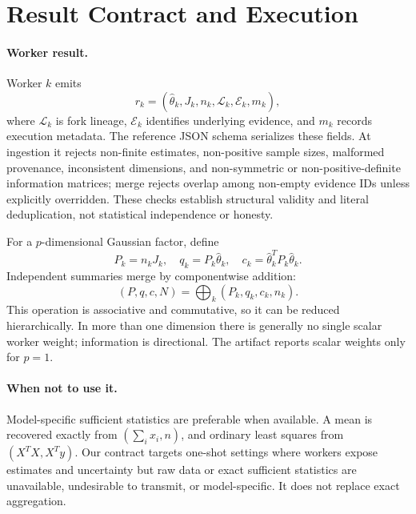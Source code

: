 \section{Result Contract and Execution}
\label{sec:model}

\paragraph{Worker result.} Worker $k$ emits
\begin{equation}
r_k=(\hat\theta_k,J_k,n_k,\mathcal L_k,\mathcal E_k,m_k),
\label{eq:contract}
\end{equation}
where $\mathcal L_k$ is fork lineage, $\mathcal E_k$ identifies underlying evidence, and $m_k$ records execution metadata. The reference JSON schema serializes these fields. At ingestion it rejects non-finite estimates, non-positive sample sizes, malformed provenance, inconsistent dimensions, and non-symmetric or non-positive-definite information matrices; merge rejects overlap among non-empty evidence IDs unless explicitly overridden. These checks establish structural validity and literal deduplication, not statistical independence or honesty.

For a $p$-dimensional Gaussian factor, define
\begin{equation}
P_k=n_kJ_k,\quad q_k=P_k\hat\theta_k,\quad
c_k=\hat\theta_k^TP_k\hat\theta_k.
\label{eq:canonical}
\end{equation}
Independent summaries merge by componentwise addition:
\begin{equation}
(P,q,c,N)=\bigoplus_k(P_k,q_k,c_k,n_k).
\label{eq:merge}
\end{equation}
This operation is associative and commutative, so it can be reduced hierarchically. In more than one dimension there is generally no single scalar worker weight; information is directional. The artifact reports scalar weights only for $p=1$.

\paragraph{When not to use it.} Model-specific sufficient statistics are preferable when available. A mean is recovered exactly from $(\sum_i x_i,n)$, and ordinary least squares from $(X^TX,X^Ty)$. Our contract targets one-shot settings where workers expose estimates and uncertainty but raw data or exact sufficient statistics are unavailable, undesirable to transmit, or model-specific. It does not replace exact aggregation.


